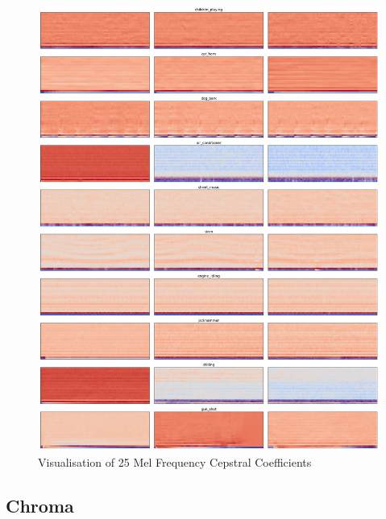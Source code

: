 \begin{figure}[H]
    \centering
	\includegraphics[width=.9\textwidth]{./images/features/mfcc-25}
    \caption{Visualisation of 25 Mel Frequency Cepstral Coefficients}
    \label{fig:mfcc}
\end{figure}



\subsection{Chroma}

